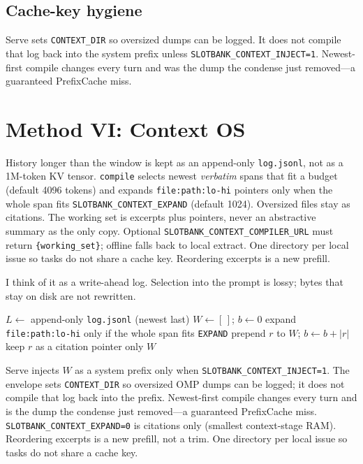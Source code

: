 \subsection{Cache-key hygiene}

Serve sets \texttt{CONTEXT\_DIR} so oversized dumps can be logged. It does not compile that log back into the system prefix unless \texttt{SLOTBANK\_CONTEXT\_INJECT=1}. Newest-first compile changes every turn and was the dump the condense just removed---a guaranteed PrefixCache miss.

\section{Method VI: Context OS}
\label{sec:context}

History longer than the window is kept as an append-only \texttt{log.jsonl}, not as a 1M-token KV tensor. \texttt{compile} selects newest \emph{verbatim} spans that fit a budget (default 4096 tokens) and expands \texttt{file:path:lo-hi} pointers only when the whole span fits \texttt{SLOTBANK\_CONTEXT\_EXPAND} (default 1024). Oversized files stay as citations. The working set is excerpts plus pointers, never an abstractive summary as the only copy. Optional \texttt{SLOTBANK\_CONTEXT\_COMPILER\_URL} must return \texttt{\{working\_set\}}; offline falls back to local extract. One directory per local issue so tasks do not share a cache key. Reordering excerpts is a new prefill.

I think of it as a write-ahead log. Selection into the prompt is lossy; bytes that stay on disk are not rewritten.

\begin{algorithm}[ht]
\caption{Context OS compile (verbatim spans, not a summary)}
\begin{algorithmic}[1]
\State $L \leftarrow$ append-only \texttt{log.jsonl} (newest last)
\State $W \leftarrow [\,]$; $b \leftarrow 0$
  \State expand \texttt{file:path:lo-hi} only if the whole span fits \texttt{EXPAND}
    \State prepend $r$ to $W$; $b \leftarrow b + |r|$
  \Else
    \State keep $r$ as a citation pointer only
  \EndIf
\EndFor
\State \Return $W$ 
\end{algorithmic}
\end{algorithm}

Serve injects $W$ as a system prefix only when \texttt{SLOTBANK\_CONTEXT\_INJECT=1}. The envelope sets \texttt{CONTEXT\_DIR} so oversized OMP dumps can be logged; it does not compile that log back into the prefix. Newest-first compile changes every turn and is the dump the condense just removed---a guaranteed PrefixCache miss. \texttt{SLOTBANK\_CONTEXT\_EXPAND=0} is citations only (smallest context-stage RAM). Reordering excerpts is a new prefill, not a trim. One directory per local issue so tasks do not share a cache key.

